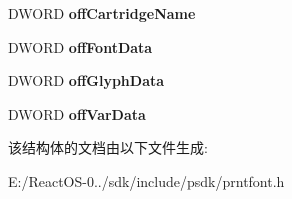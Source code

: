 \begin{DoxyCompactItemize}
\mbox{\label{struct___u_f_f___f_o_n_t_d_i_r_e_c_t_o_r_y_ad627a80e882df2b04ec78572057f599c}} 
D\+W\+O\+RD {\bfseries off\+Cartridge\+Name}
\item 
\mbox{\label{struct___u_f_f___f_o_n_t_d_i_r_e_c_t_o_r_y_ae367ef0242f9909d635b90a0eb08f573}} 
D\+W\+O\+RD {\bfseries off\+Font\+Data}
\item 
\mbox{\label{struct___u_f_f___f_o_n_t_d_i_r_e_c_t_o_r_y_ac5c7dd5c2231ec039d1c05bf56da77c3}} 
D\+W\+O\+RD {\bfseries off\+Glyph\+Data}
\item 
\mbox{\label{struct___u_f_f___f_o_n_t_d_i_r_e_c_t_o_r_y_a56aab0687c02bb9bbe3309baaab656f4}} 
D\+W\+O\+RD {\bfseries off\+Var\+Data}
\end{DoxyCompactItemize}


该结构体的文档由以下文件生成\+:\begin{DoxyCompactItemize}
\item 
E\+:/\+React\+O\+S-\/0../sdk/include/psdk/prntfont.\+h\end{DoxyCompactItemize}
